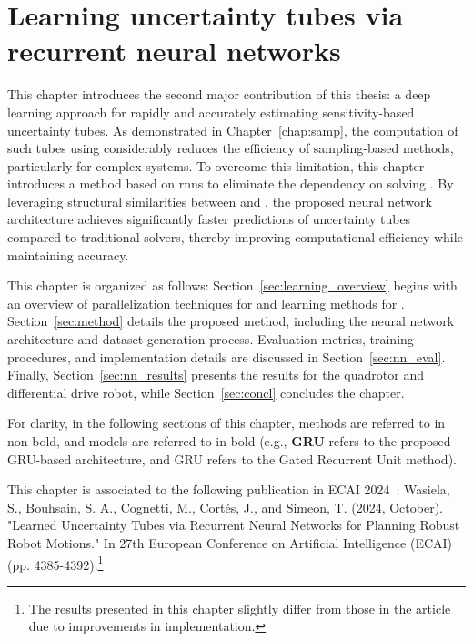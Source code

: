 \chapter{Learning uncertainty tubes via recurrent neural networks} \label{chap:NN}
\localtableofcontents \newpage

This chapter introduces the second major contribution of this thesis: a deep learning approach for rapidly and accurately estimating sensitivity-based uncertainty tubes. 
As demonstrated in Chapter~\ref{chap:samp}, the computation of such tubes using  considerably reduces the efficiency of sampling-based methods, particularly for complex systems.
To overcome this limitation, this chapter introduces a method based on \gls{rnns} to eliminate the dependency on solving .
By leveraging structural similarities between  and , the proposed neural network architecture achieves significantly faster predictions of uncertainty tubes compared to traditional solvers, thereby improving computational efficiency while maintaining accuracy.

This chapter is organized as follows: Section~\ref{sec:learning_overview} begins with an overview of parallelization techniques for  and learning methods for .
Section~\ref{sec:method} details the proposed method, including the neural network architecture and dataset generation process. 
Evaluation metrics, training procedures, and implementation details are discussed in Section~\ref{sec:nn_eval}. 
Finally, Section~\ref{sec:nn_results} presents the results for the quadrotor and differential drive robot, while Section~\ref{sec:concl} concludes the chapter.

For clarity, in the following sections of this chapter, methods are referred to in non-bold, and models are referred to in bold (e.g., \textbf{GRU} refers to the proposed GRU-based architecture, and GRU refers to the Gated Recurrent Unit method).

This chapter is associated to the following publication in ECAI 2024~\cite{cECAI}: Wasiela, S., Bouhsain, S. A., Cognetti, M., Cortés, J., and Simeon, T. (2024, October). "Learned Uncertainty Tubes via Recurrent Neural Networks for Planning Robust Robot Motions." In 27th European Conference on Artificial Intelligence (ECAI) (pp. 4385-4392).\footnote{The results presented in this chapter slightly differ from those in the article due to improvements in implementation.}

